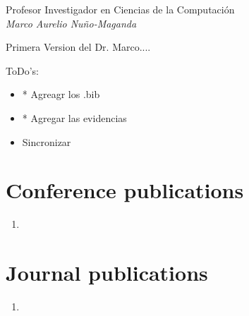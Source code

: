 \documentclass[letterpaper]{article}
\begin{document}
  \begin{flushleft}
 Profesor Investigador en Ciencias de la Computación\\
    \emph{Marco Aurelio Nuño-Maganda}\\[0.5cm]
  \end{flushleft}
  
  Primera Version del Dr. Marco....
  
  
  ToDo's:
  \begin{itemize}
  \item * Agreagr los .bib
  \item * Agregar las evidencias
  \item Sincronizar
  \end{itemize}
  

  \nocite{*}
  \printbibliography[title = {All my publications}]


  \section*{Conference publications}

  \begin{enumerate}
    \item {}
  \end{enumerate}

  \section*{Journal publications}

  \begin{enumerate}[resume]
    \item {}
  \end{enumerate}
\end{document}
